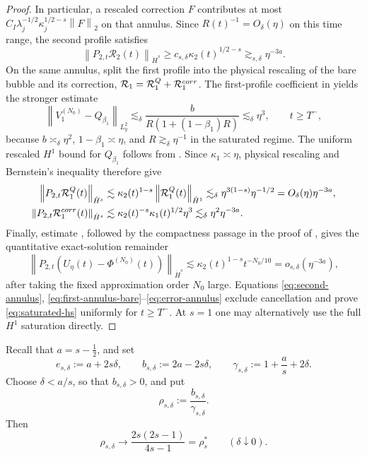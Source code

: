 \documentclass[10pt,a4paper]{amsart}
\numberwithin{equation}{section}
\newcommand{\half}{\frac12}
\newcommand{\norm}[1]{\left\lVert #1\right\rVert}
\begin{document}
\begin{proof}
In particular, a rescaled correction $F$ contributes at most
$C_I\lambda_j^{-1/2}\kappa_j^{1/2-s}\norm F_2$ on that annulus.  Since
$R(t)^{-1}=O_\delta(\eta)$ on this time range, the second profile satisfies
\begin{equation}\label{eq:second-annulus}
 \norm{P_{2,t}\mathcal R_2(t)}_{\dot H^s}
 \geq c_{s,\delta}\kappa_2(t)^{1/2-s}
 \gtrsim_{s,\delta}\eta^{-3a}.
\end{equation}
On the same annulus, split the first profile into the physical rescaling of
the bare bubble and its correction,
$\mathcal R_1=\mathcal R_1^Q+\mathcal R_1^{\rm corr}$.  The first-profile
coefficient in \cite[Proposition~4.6]{GLPR} yields the stronger estimate
\[
 \norm{V_1^{(N_0)}-Q_{\beta_1}}_{L_y^2}
 \lesssim_\delta
 \frac{b}{R(1+(1-\beta_1)R)}
 \lesssim_\delta\eta^3,
 \qquad t\geq T^-,
\]
because $b\asymp_\delta\eta^2$, $1-\beta_1\asymp\eta$, and
$R\gtrsim_\delta\eta^{-1}$ in the saturated regime.  The uniform rescaled
$H^1$ bound for $Q_{\beta_1}$ follows from
\cite[Proposition~2.3]{GLPR}.  Since $\kappa_1\asymp\eta$, physical rescaling
and Bernstein's inequality therefore give
\begin{align}
 \norm{P_{2,t}\mathcal R_1^Q(t)}_{\dot H^s}
 &\lesssim \kappa_2(t)^{1-s}
 \norm{\mathcal R_1^Q(t)}_{\dot H^1}
 \lesssim_\delta\eta^{3(1-s)}\eta^{-1/2}
 =O_\delta(\eta)\eta^{-3a},\label{eq:first-annulus-bare}\\
 \norm{P_{2,t}\mathcal R_1^{\rm corr}(t)}_{\dot H^s}
 &\lesssim \kappa_2(t)^{-s}\kappa_1(t)^{1/2}\eta^3
 \lesssim_\delta\eta^2\eta^{-3a}.
 \label{eq:first-annulus-correction}
\end{align}
Finally, estimate \cite[(5.82)]{GLPR}, followed by the compactness passage in
the proof of \cite[Theorem~1.2]{GLPR}, gives the quantitative exact-solution
remainder
\begin{equation}\label{eq:error-annulus}
 \norm{P_{2,t}(U_\eta(t)-\Phi^{(N_0)}(t))}_{\dot H^s}
 \lesssim \kappa_2(t)^{1-s}t^{-N_0/10}
 =o_{s,\delta}(\eta^{-3a}),
\end{equation}
after taking the fixed approximation order $N_0$ large.  Equations
\eqref{eq:second-annulus},
\eqref{eq:first-annulus-bare}--\eqref{eq:error-annulus} exclude cancellation and
prove \eqref{eq:saturated-hs} uniformly for $t\geq T^-$.  At $s=1$ one may
alternatively use the full $H^1$ saturation directly.
\end{proof}

Recall that $a=s-\half$, and set
\begin{equation}\label{eq:abc}
 e_{s,\delta}:=a+2s\delta,
 \qquad
 b_{s,\delta}:=2a-2s\delta,
 \qquad
 \gamma_{s,\delta}:=1+\frac as+2\delta.
\end{equation}
Choose $\delta<a/s$, so that $b_{s,\delta}>0$, and put
\begin{equation}\label{eq:rho-delta}
 \rho_{s,\delta}:=\frac{b_{s,\delta}}{\gamma_{s,\delta}}.
\end{equation}
Then
\begin{equation}\label{eq:rho-limit}
 \rho_{s,\delta}\longrightarrow
 \frac{2s(2s-1)}{4s-1}=\rho_s^*
 \qquad (\delta\downarrow0).
\end{equation}
\end{document}
